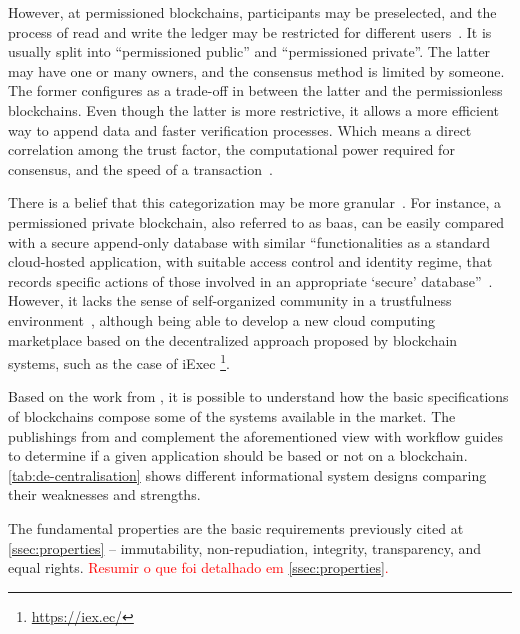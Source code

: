 However, at permissioned blockchains, participants may be preselected, and the process of read and write the ledger may be restricted for different users~\cite{itu2017}.
It is usually split into ``permissioned public'' and ``permissioned private''.
The latter may have one or many owners, and the consensus method is limited by someone.
The former configures as a trade-off in between the latter and the permissionless blockchains.
Even though the latter is more restrictive, it allows a more efficient way to append data and faster verification processes.
Which means a direct correlation among the trust factor, the computational power required for consensus, and the speed of a transaction~\cite{itu2017}.

There is a belief that this categorization may be more granular~\cite{itu2017}.
For instance, a permissioned private blockchain, also referred to as \gls{baas}, can be easily compared with a secure append-only database
with similar ``functionalities as a standard cloud-hosted application, with suitable access control and identity regime, that records specific actions of those involved in an appropriate `secure' database''~\cite{singh2017}.
However, it lacks the sense of self-organized community in a trustfulness environment~\cite{peck2017},
although being able to develop a new cloud computing marketplace based on the decentralized approach proposed by blockchain systems, such as the case of iExec%
\footnote{\href{https://iex.ec/}{https://iex.ec/}}.

Based on the work from ,
it is possible to understand how the basic specifications of blockchains compose some of the systems available in the market.
The publishings from  and  complement the aforementioned view with workflow guides to determine if a given application should be based or not on a blockchain.
\autoref{tab:de-centralisation} shows different informational system designs comparing their weaknesses and strengths.

The fundamental properties are the basic requirements previously cited at \autoref{ssec:properties} -- immutability, non-repudiation, integrity, transparency, and equal rights.
\textcolor{red}{Resumir o que foi detalhado em \autoref{ssec:properties}.}


